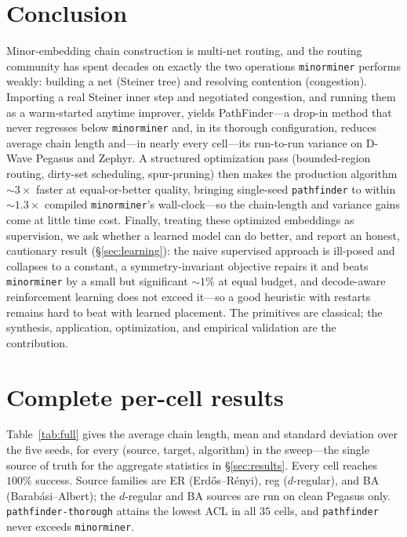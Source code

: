 \documentclass[acmsmall,anonymous,nonacm]{acmart}
\begin{document}
\section{Conclusion}
\label{sec:conclusion}

Minor-embedding chain construction is multi-net routing, and the routing
community has spent decades on exactly the two operations \texttt{minorminer}
performs weakly: building a net (Steiner tree) and resolving contention
(congestion). Importing a real Steiner inner step and negotiated congestion, and
running them as a warm-started anytime improver, yields PathFinder---a drop-in
method that never regresses below \texttt{minorminer} and, in its thorough
configuration, reduces average chain length and---in nearly every cell---its
run-to-run variance on D-Wave Pegasus and Zephyr. A structured optimization pass
(bounded-region routing, dirty-set scheduling, spur-pruning) then makes the
production algorithm ${\sim}3\times$ faster at equal-or-better quality, bringing
single-seed \texttt{pathfinder} to within ${\sim}1.3\times$ compiled
\texttt{minorminer}'s wall-clock---so the chain-length and variance gains come at
little time cost. Finally, treating these optimized embeddings as supervision, we
ask whether a learned model can do better, and report an honest, cautionary result
(\S\ref{sec:learning}): the naive supervised approach is ill-posed and collapses to a
constant, a symmetry-invariant objective repairs it and beats \texttt{minorminer} by a
small but significant ${\sim}1\%$ at equal budget, and decode-aware reinforcement
learning does not exceed it---so a good heuristic with restarts remains hard to beat
with learned placement. The primitives are classical; the
synthesis, application, optimization, and empirical validation are the contribution.

\appendix
\section{Complete per-cell results}
\label{app:full}

Table~\ref{tab:full} gives the average chain length, mean and standard deviation
over the five seeds, for every (source, target, algorithm) in the sweep---the
single source of truth for the aggregate statistics in \S\ref{sec:results}. Every
cell reaches $100\%$ success. Source families are ER (Erd\H{o}s--R\'enyi), reg
($d$-regular), and BA (Barab\'asi--Albert); the $d$-regular and BA sources are
run on clean Pegasus only. \texttt{pathfinder-thorough} attains the lowest ACL in
all $35$ cells, and \texttt{pathfinder} never exceeds \texttt{minorminer}.
\end{document}
